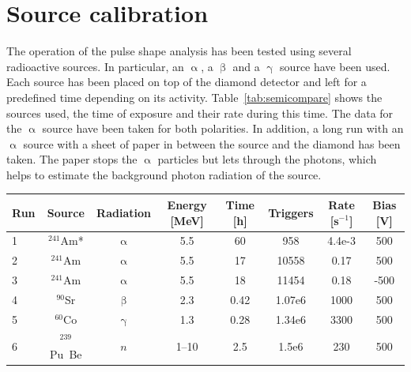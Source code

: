 \section{Source calibration}
\label{sec:sourcecalib}
The operation of the pulse shape analysis has been tested using several radioactive sources. In particular, an $\upalpha$, a $\upbeta$ and a $\upgamma$ source have been used. Each source has been placed on top of the diamond detector and left for a predefined time depending on its activity. Table~\ref{tab:semicompare} shows the sources used, the time of exposure and their rate during this time. The data for the $\upalpha$ source have been taken for both polarities. In addition, a long run with an $\upalpha$ source with a sheet of paper in between the source and the diamond has been taken. The paper stops the $\upalpha$ particles but lets through the photons, which helps to estimate the background photon radiation of the source.

\begin{footnotesize}
\begin{center}
\begin{tabular}{l c c c c c c c}
\hline
Run & Source & Radiation & Energy [MeV] & Time [h]  & Triggers & Rate [s$^{-1}$]  & Bias [V]   \\
\hline
1&$^{241}$Am*  & $\upalpha$ & 5.5 & 60 & 958 & 4.4e-3  & 500 \\
2&$^{241}$Am  & $\upalpha$ & 5.5 & 17 & 10558 & 0.17  & 500 \\
3&$^{241}$Am  & $\upalpha$ & 5.5 & 18 & 11454 & 0.18 & -500 \\
4&$^{90}$Sr  & $\upbeta$ & 2.3 & 0.42 & 1.07e6 & 1000 & 500 \\
5&$^{60}$Co  & $\upgamma$ & 1.3 & 0.28 & 1.34e6 & 3300 & 500 \\
6&$^{239}$Pu~Be  & $n$ & 1--10 & 2.5 & 1.5e6 & 230 & 500 \\ 
\hline
\end{tabular}
\label{tab:semicompare}
\end{center}
\end{footnotesize}

